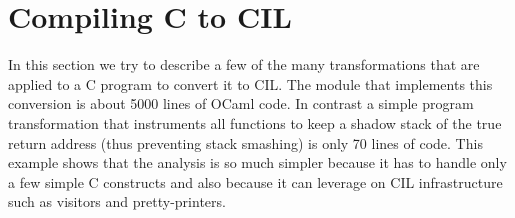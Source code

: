 \documentclass{article}
\begin{document}
\section{Compiling C to CIL}\label{sec-cabs2cil}

 In this section we try to describe a few of the many transformations that are
applied to a C program to convert it to CIL. The module that implements this
conversion is about 5000 lines of OCaml code. In contrast a simple program
transformation that instruments all functions to keep a shadow stack of the
true return address (thus preventing stack smashing) is only 70 lines of code.
This example shows that the analysis is so much simpler because it has to
handle only a few simple C constructs and also because it can leverage on CIL
infrastructure such as visitors and pretty-printers.
\end{document}
